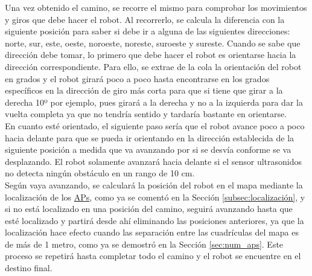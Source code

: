 Una vez obtenido el camino, se recorre el mismo para comprobar los movimientos y giros que debe hacer el robot. Al recorrerlo, se calcula la diferencia con la siguiente posición para saber si debe ir a alguna de las siguientes direcciones: norte, sur, este, oeste, noroeste, noreste, suroeste y sureste. Cuando se sabe que dirección debe tomar, lo primero que debe hacer el robot es orientarse hacia la dirección correspondiente. Para ello, se extrae de la cola la orientación del robot en grados y el robot girará poco a poco hasta encontrarse en los grados específicos en la dirección de giro más corta para que si tiene que girar a la derecha 10º por ejemplo, pues girará a la derecha y no a la izquierda para dar la vuelta completa ya que no tendría sentido y tardaría bastante en orientarse.\\

En cuanto esté orientado, el siguiente paso sería que el robot avance poco a poco hacia delante para que se pueda ir orientando en la dirección establecida de la siguiente posición a medida que va avanzando por si se desvía conforme se va desplazando. El robot solamente avanzará hacia delante si el sensor ultrasonidos no detecta ningún obstáculo en un rango de 10 cm.\\

Según vaya avanzando, se calculará la posición del robot en el mapa mediante la localización de los \hyperlink{APs}{APs}, como ya se comentó en la Sección \ref{subsec:localización}, y si no está localizado en una posición del camino, seguirá avanzando hasta que esté localizado y partirá desde ahí eliminando las posiciones anteriores, ya que la localización hace efecto cuando las separación entre las cuadrículas del mapa es de más de 1 metro, como ya se demostró en la Sección \ref{sec:num_aps}. Este proceso se repetirá hasta completar todo el camino y el robot se encuentre en el destino final.



